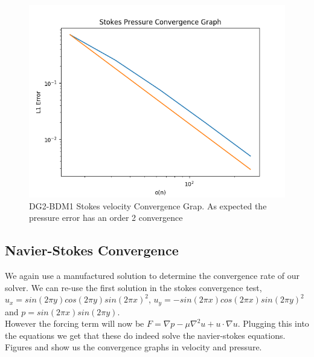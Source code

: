 \documentclass[11pt,twoside,a4paper]{article}
\begin{document}
\begin{figure}
\includegraphics[width=\linewidth]{stokes_pressure_convergence_dbc0.png}
  \caption{DG2-BDM1 Stokes velocity Convergence Grap. As expected the pressure error has an order 2 convergence}
\end{figure}

\subsection{Navier-Stokes Convergence}

We again use a manufactured solution to determine the convergence rate of our solver.
We can re-use the first solution in the stokes convergence test, $u_x = sin(2 \pi y) cos(2 \pi y)sin(2 \pi x)^2$, $u_y= -sin(2 \pi x) cos(2 \pi x) sin(2 \pi y)^2$ and $p = sin(2 \pi x) sin(2 \pi y)$.\\
However the forcing term will now be $F = \nabla p - \mu \nabla^2 u + u \cdot \nabla u$.
Plugging this into the equations we get that these do indeed solve the navier-stokes equations.\\
Figures and show us the convergence graphs in velocity and pressure.\\
\end{document}

